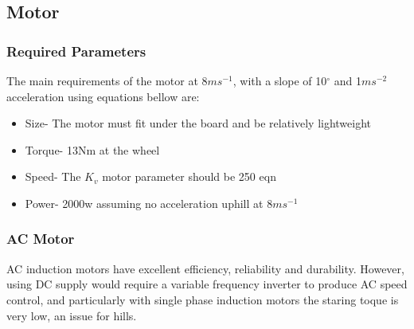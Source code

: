 \documentclass[journal,10pt]{IEEEtran}
\begin{document}
    \subsection{Motor}
        \subsubsection{Required Parameters}
        The main requirements of the motor at 8$ms^{-1}$, with a slope of 10$^{\circ}$ and 1$ms^{-2}$ acceleration using equations bellow are:
        \begin{itemize}
        	\item Size- The motor must fit under the board and be relatively lightweight
        	\item Torque- 13Nm at the wheel 
        	\item Speed- The $K_{v}$ motor parameter should be 250 eqn
        	\item Power- 2000w assuming no acceleration uphill at 8$ms^{-1}$
        \end{itemize}
        \begin{figure}[H]
            \centering
            \label{fig:equations}
        \end{figure}
        
        \subsubsection{AC Motor}
            AC induction motors have excellent efficiency, reliability and durability. However, using DC supply would require a variable frequency inverter to produce AC speed control, and particularly with single phase induction motors the staring toque is very low, an issue for hills. 
\end{document}
